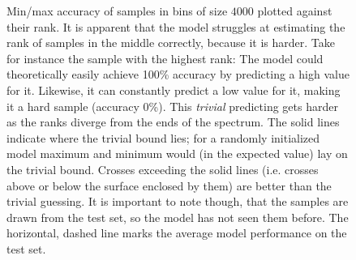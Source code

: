 \begin{figure}
    \caption[Min/max accuracy against rank]{Min/max accuracy of samples in bins of size $4000$ plotted against their rank. It is apparent that the model struggles at estimating the rank of samples in the middle correctly, because it is harder. Take for instance the sample with the highest rank: The model could theoretically easily achieve 100\% accuracy by predicting a high value for it. Likewise, it can constantly predict a low value for it, making it a hard sample (accuracy 0\%). This \textit{trivial} predicting gets harder as the ranks diverge from the ends of the spectrum. The solid lines indicate where the trivial bound lies; for a randomly initialized model maximum and minimum would (in the expected value) lay on the trivial bound. Crosses exceeding the solid lines (i.e. crosses above or below the surface enclosed by them) are better than the trivial guessing. It is important to note though, that the samples are drawn from the test set, so the model has not seen them before. The horizontal, dashed line marks the average model performance on the test set.}
    \label{fig:minmaxaccvsrank}
\end{figure}
